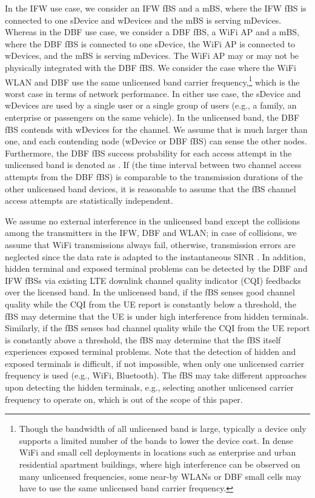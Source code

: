 \documentclass[journal,final,letterpaper,10pt,doublecolumn,twoside]{IEEEtran}
\begin{document}
In the IFW use case, we consider an IFW fBS and a mBS, where the IFW fBS is connected to one sDevice and  wDevices and the mBS is serving  mDevices. Whereas in the DBF use case, we consider a DBF fBS, a WiFi AP and a mBS, where the DBF fBS is connected to one sDevice, the WiFi AP is connected to  wDevices, and the mBS is serving  mDevices. The WiFi AP may or may not be physically integrated with the DBF fBS. We consider the case where the WiFi WLAN and DBF use the same unlicensed band carrier frequency,\footnote{Though the bandwidth of all unlicensed band is large, typically a device only supports a limited number of the bands to lower the device cost. In dense WiFi and small cell deployments in locations such as enterprise and urban residential apartment buildings, where high interference can be observed on many unlicensed frequencies, some near-by WLANs or DBF small cells may have to use the same unlicensed band carrier frequency.} which is the worst case in terms of network performance. In either use case, the sDevice and wDevices are used by a single user or a single group of users (e.g., a family, an enterprise or passengers on the same vehicle). In the unlicensed band, the DBF fBS contends with  wDevices for the channel. We assume that  is much larger than one, and each contending node (wDevice or DBF fBS) can sense the other nodes.  Furthermore, the DBF fBS success probability for each access attempt in the unlicensed band is denoted as . If  (the time interval between two channel access attempts from the DBF fBS) is comparable to the transmission durations of the other unlicensed band devices, it is reasonable to assume that the fBS channel access attempts are statistically independent.

We assume no external interference in the unlicensed band except the collisions among the transmitters in the IFW, DBF and WLAN; in case of collisions, we assume that WiFi transmissions always fail, otherwise, transmission errors are neglected since the data rate is adapted to the instantaneous SINR \cite{802.11-2007}. In addition, hidden terminal and exposed terminal problems can be detected by the DBF and IFW fBSs via existing LTE downlink channel quality indicator (CQI) feedbacks over the licensed band. In the unlicensed band, if the fBS senses good channel quality while the CQI from the UE report is constantly below a threshold, the fBS may determine that the UE is under high interference from hidden terminals. Similarly, if the fBS senses bad channel quality while the CQI from the UE report is constantly above a threshold, the fBS may determine that the fBS itself experiences exposed terminal problems. Note that the detection of hidden and exposed terminals is difficult, if not impossible, when only one unlicensed carrier frequency is used (e.g., WiFi, Bluetooth).
The fBS may take different approaches upon detecting the hidden terminals, e.g., selecting another unlicensed carrier frequency to operate on, which is out of the scope of this paper.
\end{document}
